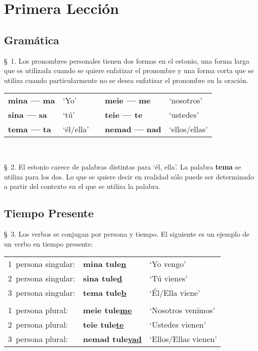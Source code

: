 
\chapter{Primera Lección} %

\label{ch:lesson01} %


\Large{\section{Gramática}}

\S\ 1. Los pronombres personales tienen dos formas en el estonio, una forma larga que es utilizada cuando se quiere enfatizar el pronombre y una forma corta que se utiliza cuando particularmente no se desea enfatizar el pronombre en la oración.\\

\begin{tabular}{ l l c l l }
	\textbf{mina — ma} & `Yo'		& &	\textbf{meie — me} 	& `nosotros' \\
	\textbf{sina — sa} & `tú'		& &	\textbf{teie — te}	& `ustedes' \\
	\textbf{tema — ta} & `él/ella'	& &	\textbf{nemad — nad}&`ellos/ellas'
\end{tabular}\\ \bigskip

\S\ 2. El estonio carece de palabras distintas para `él, ella'. La palabra \textbf{tema} se utiliza para los dos. Lo que se quiere decir en realidad sólo puede ser determinado a partir del contexto en el que se utiliza la palabra.\\

\Large{\section{Tiempo Presente}}

\S\ 3. Los verbos se conjugan por persona y tiempo. El siguiente es un ejemplo de un verbo en tiempo presente:\\

\begin{tabular}{ l l l }
	1\textordmasculine\ persona singular: 	& \textbf{mina tule\underline{n}} 		& `Yo vengo' \\
	2\textordmasculine\ persona singular: 	& \textbf{sina tule\underline{d}} 		& `Tú vienes' \\
	3\textordmasculine\ persona singular: 	& \textbf{tema tule\underline{b}} 		& `Él/Ella viene' \\
	 & & \\
	1\textordmasculine\ persona plural:		& \textbf{meie tule\underline{me}} 		& `Nosotros venimos' \\
	2\textordmasculine\ persona plural:		& \textbf{teie tule\underline{te}} 		& `Ustedes vienen' \\
	3\textordmasculine\ persona plural:		& \textbf{nemad tule\underline{vad}} 	& `Ellos/Ellas vienen'
\end{tabular}\\ \bigskip

